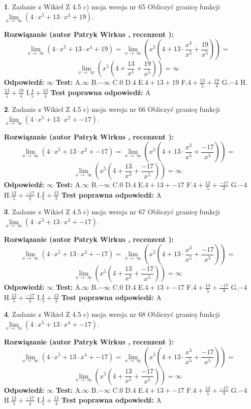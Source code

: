\documentclass[12pt, a4paper]{article}
\theoremstyle{definition} %
\newtheorem{zad}{}
\newcommand{\zadStart}[1]{\begin{zad}#1\newline}
\newcommand{\zadStop}{\end{zad}}
\newcommand{\rozwStart}[2]{\noindent \textbf{Rozwiązanie (autor #1 , recenzent #2): }\newline}
\newcommand{\rozwStop}{\newline}
\newcommand{\odpStart}{\noindent \textbf{Odpowiedź:}\newline}
\newcommand{\odpStop}{\newline}
\newcommand{\testStart}{\noindent \textbf{Test:}\newline}
\newcommand{\testStop}{\newline}
\newcommand{\kluczStart}{\noindent \textbf{Test poprawna odpowiedź:}\newline}
\newcommand{\kluczStop}{\newline}
\begin{document}
\zadStart{Zadanie z Wikieł Z 4.5 c) moja wersja nr 65}
Obliczyć granicę funkcji  $\lim\limits_{x\to\ \infty}(4 \cdot x^{5}+13 \cdot x^{4}+19)$.
\zadStop
\rozwStart{Patryk Wirkus}{}
$$\lim\limits_{x\to\ \infty}(4 \cdot x^{5}+13 \cdot x^{4}+19) = \lim\limits_{x\to\ \infty}(x^{5}(4 +13 \cdot \frac{x^{4}}{x^{5}}+\frac{19}{x^{5}})) =$$ $$\lim\limits_{x\to\ \infty}(x^{5}(4 +\frac{13}{x^{1}}+\frac{19}{x^{5}})) =\infty$$
\rozwStop
\odpStart
$\infty$
\odpStop
\testStart
A.$\infty$ B.$-\infty$ C.$0$ D.$4$ E.$4 + 13 + 19$
F.$4+\frac{13}{5}+\frac{19}{4}$ G.$-4$
H.$\frac{13}{5}+\frac{19}{4}$
I.$\frac{4}{5}+\frac{13}{4}$
\testStop
\kluczStart
A
\kluczStop



\zadStart{Zadanie z Wikieł Z 4.5 c) moja wersja nr 66}
Obliczyć granicę funkcji  $\lim\limits_{x\to\ \infty}(4 \cdot x^{5}+13 \cdot x^{2}+-17)$.
\zadStop
\rozwStart{Patryk Wirkus}{}
$$\lim\limits_{x\to\ \infty}(4 \cdot x^{5}+13 \cdot x^{2}+-17) = \lim\limits_{x\to\ \infty}(x^{5}(4 +13 \cdot \frac{x^{2}}{x^{5}}+\frac{-17}{x^{5}})) =$$ $$\lim\limits_{x\to\ \infty}(x^{5}(4 +\frac{13}{x^{3}}+\frac{-17}{x^{5}})) =\infty$$
\rozwStop
\odpStart
$\infty$
\odpStop
\testStart
A.$\infty$ B.$-\infty$ C.$0$ D.$4$ E.$4 + 13 + -17$
F.$4+\frac{13}{5}+\frac{-17}{2}$ G.$-4$
H.$\frac{13}{5}+\frac{-17}{2}$
I.$\frac{4}{5}+\frac{13}{2}$
\testStop
\kluczStart
A
\kluczStop



\zadStart{Zadanie z Wikieł Z 4.5 c) moja wersja nr 67}
Obliczyć granicę funkcji  $\lim\limits_{x\to\ \infty}(4 \cdot x^{5}+13 \cdot x^{3}+-17)$.
\zadStop
\rozwStart{Patryk Wirkus}{}
$$\lim\limits_{x\to\ \infty}(4 \cdot x^{5}+13 \cdot x^{3}+-17) = \lim\limits_{x\to\ \infty}(x^{5}(4 +13 \cdot \frac{x^{3}}{x^{5}}+\frac{-17}{x^{5}})) =$$ $$\lim\limits_{x\to\ \infty}(x^{5}(4 +\frac{13}{x^{2}}+\frac{-17}{x^{5}})) =\infty$$
\rozwStop
\odpStart
$\infty$
\odpStop
\testStart
A.$\infty$ B.$-\infty$ C.$0$ D.$4$ E.$4 + 13 + -17$
F.$4+\frac{13}{5}+\frac{-17}{3}$ G.$-4$
H.$\frac{13}{5}+\frac{-17}{3}$
I.$\frac{4}{5}+\frac{13}{3}$
\testStop
\kluczStart
A
\kluczStop



\zadStart{Zadanie z Wikieł Z 4.5 c) moja wersja nr 68}
Obliczyć granicę funkcji  $\lim\limits_{x\to\ \infty}(4 \cdot x^{5}+13 \cdot x^{4}+-17)$.
\zadStop
\rozwStart{Patryk Wirkus}{}
$$\lim\limits_{x\to\ \infty}(4 \cdot x^{5}+13 \cdot x^{4}+-17) = \lim\limits_{x\to\ \infty}(x^{5}(4 +13 \cdot \frac{x^{4}}{x^{5}}+\frac{-17}{x^{5}})) =$$ $$\lim\limits_{x\to\ \infty}(x^{5}(4 +\frac{13}{x^{1}}+\frac{-17}{x^{5}})) =\infty$$
\rozwStop
\odpStart
$\infty$
\odpStop
\testStart
A.$\infty$ B.$-\infty$ C.$0$ D.$4$ E.$4 + 13 + -17$
F.$4+\frac{13}{5}+\frac{-17}{4}$ G.$-4$
H.$\frac{13}{5}+\frac{-17}{4}$
I.$\frac{4}{5}+\frac{13}{4}$
\testStop
\kluczStart
A
\kluczStop
\end{document}
